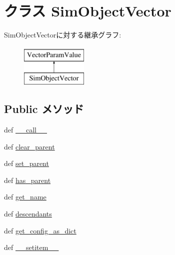 \hypertarget{classm5_1_1params_1_1SimObjectVector}{
\section{クラス SimObjectVector}
\label{classm5_1_1params_1_1SimObjectVector}
}
SimObjectVectorに対する継承グラフ:\begin{figure}[H]
\begin{center}
\leavevmode
\includegraphics[height=2cm]{classm5_1_1params_1_1SimObjectVector}
\end{center}
\end{figure}
\subsection*{Public メソッド}
\begin{DoxyCompactItemize}
\item 
def \hyperlink{classm5_1_1params_1_1SimObjectVector_ae844e0019d38360a86bac1474132db3c}{\_\-\_\-call\_\-\_\-}
\item 
def \hyperlink{classm5_1_1params_1_1SimObjectVector_a087680f475bb0223aaae928a37e04c3e}{clear\_\-parent}
\item 
def \hyperlink{classm5_1_1params_1_1SimObjectVector_a625d1d3f49ccb2ff8aacebe992396065}{set\_\-parent}
\item 
def \hyperlink{classm5_1_1params_1_1SimObjectVector_a71e011e66af177233516716c34212661}{has\_\-parent}
\item 
def \hyperlink{classm5_1_1params_1_1SimObjectVector_a2f3160d6b4e517398ca3f9e51b260bb7}{get\_\-name}
\item 
def \hyperlink{classm5_1_1params_1_1SimObjectVector_acf2e57325b000a537cce1d359185f734}{descendants}
\item 
def \hyperlink{classm5_1_1params_1_1SimObjectVector_ab1772c0da7b9e12819e1c0373513c53c}{get\_\-config\_\-as\_\-dict}
\item 
def \hyperlink{classm5_1_1params_1_1SimObjectVector_a09195b01147e970ca71c48b57f653940}{\_\-\_\-setitem\_\-\_\-}
\end{DoxyCompactItemize}


